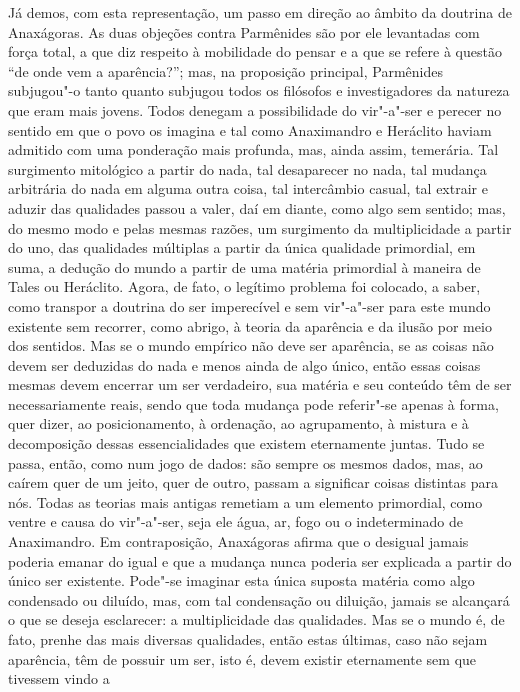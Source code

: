 Já demos, com esta representação, um passo em direção ao âmbito da doutrina de
Anaxágoras. As duas objeções contra Parmênides são por ele levantadas com
força total, a que diz respeito à mobilidade do pensar e a que se refere à
questão ``de onde vem a aparência?''; mas, na proposição principal,
Parmênides subjugou"-o tanto quanto subjugou todos os filósofos e
investigadores da natureza que eram mais jovens. Todos denegam a
possibilidade do vir"-a"-ser e perecer no sentido em que o povo os imagina e
tal como Anaximandro e Heráclito haviam admitido com uma ponderação mais
profunda, mas, ainda assim, temerária. Tal surgimento mitológico a partir do
nada, tal desaparecer no nada, tal mudança arbitrária do nada em alguma outra
coisa, tal intercâmbio casual, tal extrair e aduzir das qualidades passou a
valer, daí em diante, como algo sem sentido; mas, do mesmo modo e pelas
mesmas razões, um surgimento da multiplicidade a partir do uno, das
qualidades múltiplas a partir da única qualidade primordial, em suma, a
dedução do mundo a partir de uma matéria primordial à maneira de Tales ou
Heráclito. Agora, de fato, o legítimo problema foi colocado, a saber, como
transpor a doutrina do ser imperecível e sem vir"-a"-ser para este mundo
existente sem recorrer, como abrigo, à teoria da aparência e da ilusão por
meio dos sentidos. Mas se o mundo empírico não deve ser aparência, se as
coisas não devem ser deduzidas do nada e menos ainda de algo único, então
essas coisas mesmas devem encerrar um ser verdadeiro, sua matéria e seu
conteúdo têm de ser necessariamente reais, sendo que toda mudança pode
referir"-se apenas à forma, quer dizer, ao posicionamento, à ordenação, ao
agrupamento, à mistura e à decomposição dessas essencialidades que existem
eternamente juntas. Tudo se passa, então, como num jogo de dados: são sempre
os mesmos dados, mas, ao caírem quer de um jeito, quer de outro, passam a
significar coisas distintas para nós. Todas as teorias mais antigas remetiam
a um elemento primordial, como ventre e causa do vir"-a"-ser, seja ele água,
ar, fogo ou o indeterminado de Anaximandro. Em contraposição, Anaxágoras
afirma que o desigual jamais poderia emanar do igual e que a mudança nunca
poderia ser explicada a partir do único ser existente. Pode"-se imaginar esta
única suposta matéria como algo condensado ou diluído, mas, com tal
condensação ou diluição, jamais se alcançará o que se deseja esclarecer: a
multiplicidade das qualidades. Mas se o mundo é, de fato, prenhe das mais
diversas qualidades, então estas últimas, caso não sejam aparência, têm de
possuir um ser, isto é, devem existir eternamente sem que tivessem vindo a
